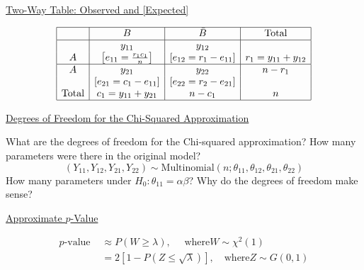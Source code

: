 \documentclass[oneside]{book}
\begin{document}
\underline{Two-Way Table: Observed and [Expected]}

\[ \begin{array}{|c|c|c|c|}
        \hline       & B                                           & \bar{B}                            & \text{Total}        \\
        \hline
                     & y_{11}                                      & y_{12}                             &                     \\
        A            & {\left[e_{11}=\frac{r_{1} c_{1}}{n}\right]} & {\left[e_{12}=r_{1}-e_{11}\right]} & r_{1}=y_{11}+y_{12} \\
        \hline A     & y_{21}                                      & y_{22}                             & n-r_{1}             \\
                     & {\left[e_{21}=c_{1}-e_{11}\right]}          & {\left[e_{22}=r_{2}-e_{21}\right]} &                     \\
        \text{Total} & c_{1}=y_{11}+y_{21}                         & n-c_{1}                            & n                   \\
        \hline
    \end{array} \]

\underline{Degrees of Freedom for the Chi-Squared Approximation}

What are the degrees of freedom for the Chi-squared approximation?
How many parameters were there in the original model?
\[
    \left(Y_{11}, Y_{12}, Y_{21}, Y_{22}\right) \sim \text{Multinomial}\left(n ; \theta_{11}, \theta_{12}, \theta_{21}, \theta_{22}\right)
\]
How many parameters under $H_{0}: \theta_{11}=\alpha \beta $?
Why do the degrees of freedom make sense?

\underline{Approximate $ p $-Value}

\[ \begin{aligned}
        p \text{-value } & \approx P(W \geq \lambda), \quad \text{ where} W \sim \chi^{2}(1) \\
                         & =2[1-P(Z \leq \sqrt{\lambda})], \quad \text{where} Z \sim G(0,1)
    \end{aligned} \]
\end{document}
